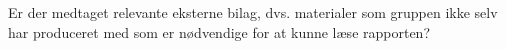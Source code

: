 Er der medtaget relevante eksterne bilag, dvs. materialer som gruppen ikke selv har produceret med som er nødvendige for at kunne læse rapporten?
